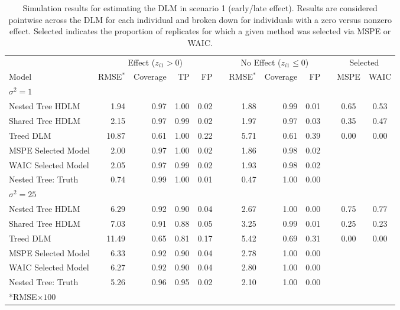 \documentclass[12pt]{article}
\begin{document}
\begin{table}[!ht]
\scriptsize
    \centering
    \caption{Simulation results for estimating the DLM in scenario 1 (early/late effect). Results are considered pointwise across the DLM for each individual and broken down for individuals with a zero versus nonzero effect. Selected indicates the proportion of replicates for which a given method was selected via MSPE or WAIC.}\vspace{6pt}
    \label{tab:scen1_res}
    \begin{tabular}{lrrrrrrrrrcc}
        \toprule[2pt]
        &\multicolumn{4}{c}{Effect ($z_{i1}>0$)}&&\multicolumn{3}{c}{No Effect ($z_{i1}\leq0$)}&&\multicolumn{2}{c}{Selected}\\
        \cmidrule(lr){2-5} \cmidrule(lr){7-9} \cmidrule(lr){11-12}
        Model & RMSE$^*$ & Coverage & TP & FP & \phantom{} &RMSE$^*$ & Coverage & FP && MSPE & WAIC\\
        \midrule
        \multicolumn{9}{l}{$\sigma^2=1$}\\
      Nested Tree HDLM & 1.94 & 0.97 & 1.00 & 0.02 &  & 1.88 & 0.99 & 0.01 &  & 0.65 & 0.53\\
      Shared Tree HDLM & 2.15 & 0.97 & 0.99 & 0.02 &  & 1.97 & 0.97 & 0.03 &  & 0.35 & 0.47\\

            Treed DLM & 10.87 & 0.61 & 1.00 & 0.22 &  & 5.71 & 0.61 & 0.39 &  & 0.00 & 0.00\\
\addlinespace
MSPE Selected Model & 2.00 & 0.97 & 1.00 & 0.02 &  & 1.86 & 0.98 & 0.02 &  \\
WAIC Selected Model & 2.05 & 0.97 & 0.99 & 0.02 &  & 1.93 & 0.98 & 0.02 &  \\
\addlinespace
   Nested Tree: Truth & 0.74 & 0.99 & 1.00 & 0.01 &  & 0.47 & 1.00 & 0.00 &  \\


\midrule
        
        \multicolumn{9}{l}{$\sigma^2=25$}\\
        Nested Tree HDLM & 6.29 & 0.92 & 0.90 & 0.04 &  & 2.67 & 1.00 & 0.00 &  & 0.75 & 0.77\\
        Shared Tree HDLM & 7.03 & 0.91 & 0.88 & 0.05 &  & 3.25 & 0.99 & 0.01 &  & 0.25 & 0.23\\
              Treed DLM & 11.49 & 0.65 & 0.81 & 0.17 &  & 5.42 & 0.69 & 0.31 &  & 0.00 & 0.00\\
\addlinespace
MSPE Selected Model & 6.33 & 0.92 & 0.90 & 0.04 &  & 2.78 & 1.00 & 0.00 &   \\
WAIC Selected Model & 6.27 & 0.92 & 0.90 & 0.04 &  & 2.80 & 1.00 & 0.00 &  \\
\addlinespace
      Nested Tree: Truth & 5.26 & 0.96 & 0.95 & 0.02 &  & 2.10 & 1.00 & 0.00 & \\
        \bottomrule[2pt]
        \multicolumn{9}{l}{*RMSE$\times100$}\\
    \end{tabular}
\end{table}
\end{document}
